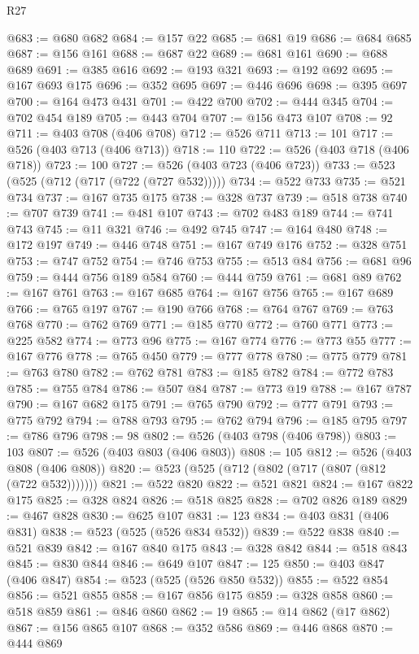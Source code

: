 \begin{lexlean}{R27}
\begin{coremodule}
@683 := @680 @682
@684 := @157 @22
@685 := @681 @19
@686 := @684 @685
@687 := @156 @161
@688 := @687 @22
@689 := @681 @161
@690 := @688 @689
@691 := @385 @616
@692 := @193 @321
@693 := @192 @692
@695 := @167 @693 @175
@696 := @352 @695
@697 := @446 @696
@698 := @395 @697
@700 := @164 @473 @431
@701 := @422 @700
@702 := @444 @345
@704 := @702 @454 @189
@705 := @443 @704
@707 := @156 @473 @107
@708 := 92
@711 := @403 @708 (@406 @708)
@712 := @526 @711
@713 := 101
@717 := @526 (@403 @713 (@406 @713))
@718 := 110
@722 := @526 (@403 @718 (@406 @718))
@723 := 100
@727 := @526 (@403 @723 (@406 @723))
@733 := @523 (@525 (@712 (@717 (@722 (@727 @532)))))
@734 := @522 @733
@735 := @521 @734
@737 := @167 @735 @175
@738 := @328 @737
@739 := @518 @738
@740 := @707 @739
@741 := @481 @107
@743 := @702 @483 @189
@744 := @741 @743
@745 := @11 @321
@746 := @492 @745
@747 := @164 @480
@748 := @172 @197
@749 := @446 @748
@751 := @167 @749 @176
@752 := @328 @751
@753 := @747 @752
@754 := @746 @753
@755 := @513 @84
@756 := @681 @96
@759 := @444 @756 @189 @584
@760 := @444 @759
@761 := @681 @89
@762 := @167 @761
@763 := @167 @685
@764 := @167 @756
@765 := @167 @689
@766 := @765 @197
@767 := @190 @766
@768 := @764 @767
@769 := @763 @768
@770 := @762 @769
@771 := @185 @770
@772 := @760 @771
@773 := @225 @582
@774 := @773 @96
@775 := @167 @774
@776 := @773 @55
@777 := @167 @776
@778 := @765 @450
@779 := @777 @778
@780 := @775 @779
@781 := @763 @780
@782 := @762 @781
@783 := @185 @782
@784 := @772 @783
@785 := @755 @784
@786 := @507 @84
@787 := @773 @19
@788 := @167 @787
@790 := @167 @682 @175
@791 := @765 @790
@792 := @777 @791
@793 := @775 @792
@794 := @788 @793
@795 := @762 @794
@796 := @185 @795
@797 := @786 @796
@798 := 98
@802 := @526 (@403 @798 (@406 @798))
@803 := 103
@807 := @526 (@403 @803 (@406 @803))
@808 := 105
@812 := @526 (@403 @808 (@406 @808))
@820 := @523 (@525 (@712 (@802 (@717 (@807 (@812 (@722 @532)))))))
@821 := @522 @820
@822 := @521 @821
@824 := @167 @822 @175
@825 := @328 @824
@826 := @518 @825
@828 := @702 @826 @189
@829 := @467 @828
@830 := @625 @107
@831 := 123
@834 := @403 @831 (@406 @831)
@838 := @523 (@525 (@526 @834 @532))
@839 := @522 @838
@840 := @521 @839
@842 := @167 @840 @175
@843 := @328 @842
@844 := @518 @843
@845 := @830 @844
@846 := @649 @107
@847 := 125
@850 := @403 @847 (@406 @847)
@854 := @523 (@525 (@526 @850 @532))
@855 := @522 @854
@856 := @521 @855
@858 := @167 @856 @175
@859 := @328 @858
@860 := @518 @859
@861 := @846 @860
@862 := 19
@865 := @14 @862 (@17 @862)
@867 := @156 @865 @107
@868 := @352 @586
@869 := @446 @868
@870 := @444 @869

\end{coremodule}
\end{lexlean}
